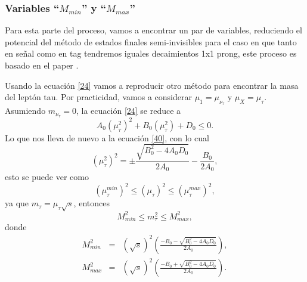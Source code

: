 \subsubsection{Variables ``\texorpdfstring{$M_{min}$}{TEXT}'' y ``\texorpdfstring{$M_{max}$}{TEXT}''}
Para esta parte del proceso, vamos a encontrar un par de variables, reduciendo el potencial del método de estados finales semi-invisibles para el caso en que tanto en señal como en tag tendremos iguales decaimientos 1x1 prong, este proceso es basado en el paper \cite{PhysRevD.102.115001}. 

Usando la ecuación \ref{24} vamos a reproducir otro método para encontrar la masa del leptón tau. Por practicidad, vamos a considerar \(\mu_{1} = \mu_{\nu_{\tau}}\) y \(\mu_{X}=\mu_{\tau}\). Asumiendo \(m_{\nu_{\tau}}=0\), la ecuación \ref{24} se reduce a
\begin{equation}
    A_0(\mu_{\tau}^2)^2+B_0(\mu_{\tau}^2)+D_0\leq0.
\end{equation}
Lo que nos lleva de nuevo a la ecuación \ref{40}, con lo cual
\begin{equation}
    (\mu_{\tau}^2)^2=\pm\frac{\sqrt{B_0^2-4A_0D_0}}{2A_0}-\frac{B_0}{2A_0},
\end{equation}
esto se puede ver como
\begin{equation}
    \left(\mu_{\tau}^{min}\right)^2\leq(\mu_{\tau})^2\leq\left(\mu_{\tau}^{max}\right)^2,
\end{equation}
ya que \(m_{\tau}=\mu_{\tau}\sqrt{s}\), entonces
\begin{equation}
    M_{min}^2\leq m_{\tau}^2 \leq M_{max}^2,
\end{equation}
donde
\begin{eqnarray}
    M_{min}^2&=&\left(\sqrt{s}\right)^2\left(\frac{-B_0-\sqrt{B_0^2-4A_0D_0}}{2A_0}\right),\\
    M_{max}^2&=&\left(\sqrt{s}\right)^2\left(\frac{-B_0+\sqrt{B_0^2-4A_0D_0}}{2A_0}\right).
\end{eqnarray}

